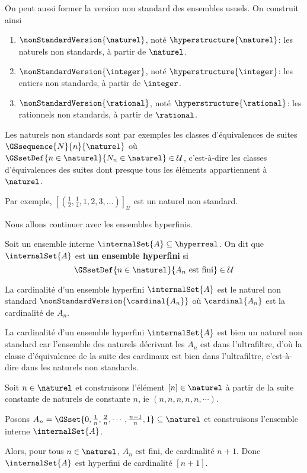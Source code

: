 On peut aussi former la version non standard des ensembles usuels. On construit
ainsi
\begin{enumerate}
	\item $\nonStandardVersion{\naturel}$, noté $\hyperstructure{\naturel}$: les
		naturels non standards, à partir de $\naturel$.
	\item $\nonStandardVersion{\integer}$, noté $\hyperstructure{\integer}$: les
		entiers non standards, à partir de $\integer$.
	\item $\nonStandardVersion{\rational}$, noté $\hyperstructure{\rational}$:
		les rationnels non standards, à partir de $\rational$.
\end{enumerate}

Les naturels non standards sont par exemples les classes d'équivalences de
suites
$\GSsequence{N}{n}{\naturel}$ où $\GSsetDef{n \in \naturel}{N_{n} \in \naturel}
\in \mathcal{U}$, c'est-à-dire les classes d'équivalences des suites dont
presque tous les éléments appartiennent à $\naturel$.

Par exemple, $[(\frac{1}{2}, \frac{1}{4}, 1, 2, 3, \dots)]_{\mathcal{U}}$ est un
naturel non standard.

Nous allons continuer avec les ensembles hyperfinis.

\begin{definition} 
	Soit un ensemble interne $\internalSet{A} \subseteq \hyperreal$. On dit
	que $\internalSet{A}$ est \textbf{un ensemble hyperfini} si
	\begin{equation}
		\GSsetDef{n \in \naturel}{A_{n} \text{ est fini}} \in \mathcal{U}
	\end{equation}

	La cardinalité d'un ensemble hyperfini $\internalSet{A}$ est le naturel
	non standard $\nonStandardVersion{\cardinal{A_{n}}}$ où $\cardinal{A_{n}}$ est la
	cardinalité de $A_{n}$.
\end{definition}

\begin{remarque}
	La cardinalité d'un ensemble hyperfini $\internalSet{A}$ est bien un
	naturel non standard car l'ensemble des naturels décrivant les $A_{n}$ est
	dans l'ultrafiltre, d'où la classe d'équivalence de la suite des cardinaux
	est bien dans l'ultrafiltre, c'est-à-dire dans les naturels non standards.
\end{remarque}

\begin{exemple}
	Soit $n \in \naturel$ et construisons l'élément $[n] \in \naturel$ à partir
	de la suite constante de naturels de constante $n$, ie $(n, n, n, n, n,
	\cdots)$.

	Posons $A_{n} = \GSset{0, \frac{1}{n}, \frac{2}{n}, \cdots, \frac{n -
	1}{n}, 1} \subseteq \naturel$ et construisons l'ensemble interne
	$\internalSet{A}$.

	Alors, pour tous $n \in \naturel$, $A_{n}$ est fini, de cardinalité $n + 1$.
	Donc $\internalSet{A}$ est hyperfini de cardinalité $[n + 1]$.
\end{exemple}

